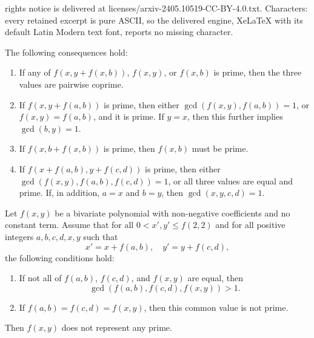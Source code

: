 \documentclass[10pt,a4paper]{amsart}
\begin{document}
rights notice is delivered at licenses/arxiv-2405.10519-CC-BY-4.0.txt. Characters: every retained excerpt is pure ASCII, so the delivered engine, XeLaTeX with its default Latin Modern text font, reports no missing character.
	\begin{corollary}\label{cor:m}
		The following consequences hold:
		\begin{enumerate}
			\item If any of $f(x, y + f(x, b))$, $f(x, y)$, or $f(x, b)$ is prime, then the three values are pairwise coprime.
			\item If $f(x, y + f(a, b))$ is prime, then either $\gcd(f(x, y), f(a, b)) = 1$, or $f(x, y) = f(a, b)$, and it is prime. If $y = x$, then this further implies $\gcd(b, y) = 1$.
			\item If $f(x, b + f(x, b))$ is prime, then $f(x, b)$ must be prime.
			\item If $f(x + f(a, b), y + f(c, d))$ is prime, then either $\gcd(f(x, y), f(a, b), f(c, d)) = 1$, or all three values are equal and prime. If, in addition, $a = x$ and $b = y$, then $\gcd(x, y, c, d) = 1$.
		\end{enumerate}
	\end{corollary}

	\begin{theorem}\label{mth}
		Let $f(x, y)$ be a bivariate polynomial with non-negative coefficients and no constant term. Assume that for all $0 < x', y' \leq f(2,2)$ and for all positive integers $a, b, c, d, x, y$ such that
		\[
		x' = x + f(a, b), \quad y' = y + f(c, d),
		\]
		the following conditions hold:
		\begin{enumerate}
			\item If not all of $f(a,b)$, $f(c,d)$, and $f(x,y)$ are equal, then
			\[
			\gcd(f(a,b), f(c,d), f(x,y)) > 1.
			\]
			\item If $f(a,b) = f(c,d) = f(x,y)$, then this common value is not prime.
		\end{enumerate}
		Then $f(x, y)$ does not represent any prime.
	\end{theorem}
\end{document}

